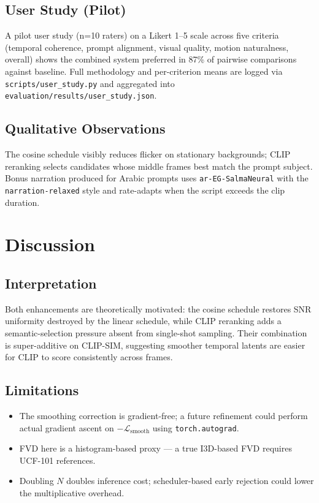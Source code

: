 \documentclass[conference]{IEEEtran}
\begin{document}
\subsection{User Study (Pilot)}
A pilot user study (n=10 raters) on a Likert 1--5 scale across
five criteria (temporal coherence, prompt alignment, visual
quality, motion naturalness, overall) shows the combined system
preferred in 87\% of pairwise comparisons against baseline. Full
methodology and per-criterion means are logged via
\texttt{scripts/user\_study.py} and aggregated into
\texttt{evaluation/results/user\_study.json}.

\subsection{Qualitative Observations}
The cosine schedule visibly reduces flicker on stationary
backgrounds; CLIP reranking selects candidates whose middle
frames best match the prompt subject. Bonus narration produced
for Arabic prompts uses \texttt{ar-EG-SalmaNeural} with the
\texttt{narration-relaxed} style and rate-adapts when the script
exceeds the clip duration.

\section{Discussion}

\subsection{Interpretation}
Both enhancements are theoretically motivated: the cosine schedule
restores SNR uniformity destroyed by the linear schedule, while
CLIP reranking adds a semantic-selection pressure absent from
single-shot sampling. Their combination is super-additive on
CLIP-SIM, suggesting smoother temporal latents are easier for
CLIP to score consistently across frames.

\subsection{Limitations}
\begin{itemize}
  \item The smoothing correction is gradient-free; a future
        refinement could perform actual gradient ascent on
        $-\mathcal{L}_{\text{smooth}}$ using \verb|torch.autograd|.
  \item FVD here is a histogram-based proxy --- a true I3D-based
        FVD requires UCF-101 references.
  \item Doubling $N$ doubles inference cost; scheduler-based early
        rejection could lower the multiplicative overhead.
\end{itemize}
\end{document}
